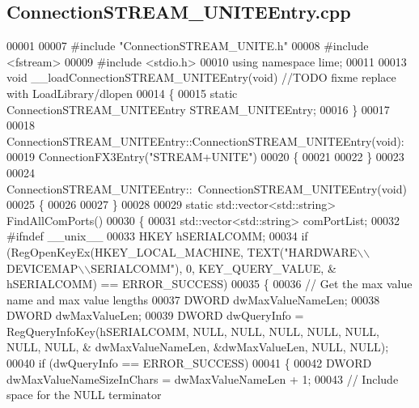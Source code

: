 \subsection{Connection\+S\+T\+R\+E\+A\+M\+\_\+\+U\+N\+I\+T\+E\+Entry.\+cpp}
\label{ConnectionSTREAM__UNITEEntry_8cpp_source}

\begin{DoxyCode}
00001 
00007 \textcolor{preprocessor}{#include "ConnectionSTREAM_UNITE.h"}
00008 \textcolor{preprocessor}{#include <fstream>}
00009 \textcolor{preprocessor}{#include <stdio.h>}
00010 \textcolor{keyword}{using namespace }lime;
00011 
00013 \textcolor{keywordtype}{void} __loadConnectionSTREAM_UNITEEntry(\textcolor{keywordtype}{void}) \textcolor{comment}{//TODO fixme replace with LoadLibrary/dlopen}
00014 \{
00015 \textcolor{keyword}{static} ConnectionSTREAM_UNITEEntry STREAM\_UNITEEntry;
00016 \}
00017 
00018 ConnectionSTREAM_UNITEEntry::ConnectionSTREAM_UNITEEntry(\textcolor{keywordtype}{void}):
00019     ConnectionFX3Entry(\textcolor{stringliteral}{"STREAM+UNITE"})
00020 \{
00021 
00022 \}
00023 
00024 ConnectionSTREAM_UNITEEntry::~ConnectionSTREAM_UNITEEntry(\textcolor{keywordtype}{void})
00025 \{
00026 
00027 \}
00028 
00029 \textcolor{keyword}{static} std::vector<std::string> FindAllComPorts()
00030 \{
00031     std::vector<std::string> comPortList;
00032 \textcolor{preprocessor}{#ifndef \_\_unix\_\_}
00033     HKEY hSERIALCOMM;
00034     \textcolor{keywordflow}{if} (RegOpenKeyEx(HKEY\_LOCAL\_MACHINE, TEXT(\textcolor{stringliteral}{"HARDWARE\(\backslash\)\(\backslash\)DEVICEMAP\(\backslash\)\(\backslash\)SERIALCOMM"}),   0, KEY\_QUERY\_VALUE, &
      hSERIALCOMM) == ERROR\_SUCCESS)
00035     \{
00036         \textcolor{comment}{// Get the max value name and max value lengths}
00037         DWORD dwMaxValueNameLen;
00038         DWORD dwMaxValueLen;
00039         DWORD dwQueryInfo = RegQueryInfoKey(hSERIALCOMM, NULL, NULL, NULL, NULL, NULL, NULL, NULL, &
      dwMaxValueNameLen, &dwMaxValueLen, NULL, NULL);
00040         \textcolor{keywordflow}{if} (dwQueryInfo == ERROR\_SUCCESS)
00041         \{
00042             DWORD dwMaxValueNameSizeInChars = dwMaxValueNameLen + 1;
00043             \textcolor{comment}{// Include space for the NULL terminator}

\end{DoxyCode}
